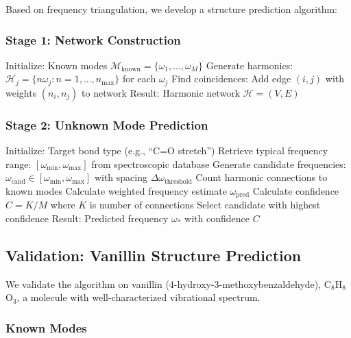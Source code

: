Based on frequency triangulation, we develop a structure prediction algorithm:

\subsubsection{Stage 1: Network Construction}

\begin{algorithmic}[1]
\State Initialize: Known modes $\mathcal{M}_{\text{known}} = \{\omega_1, ..., \omega_M\}$
\State Generate harmonics: $\mathcal{H}_j = \{n\omega_j : n = 1, ..., n_{\max}\}$ for each $\omega_j$
\State Find coincidences:
            \State Add edge $(i, j)$ with weights $(n_i, n_j)$ to network
        \EndIf
    \EndFor
\EndFor
\State Result: Harmonic network $\mathcal{H} = (V, E)$
\end{algorithmic}

\subsubsection{Stage 2: Unknown Mode Prediction}

\begin{algorithmic}[1]
\State Initialize: Target bond type (e.g., ``C=O stretch'')
\State Retrieve typical frequency range: $[\omega_{\min}, \omega_{\max}]$ from spectroscopic database
\State Generate candidate frequencies: $\omega_{\text{cand}} \in [\omega_{\min}, \omega_{\max}]$ with spacing $\Delta\omega_{\text{threshold}}$
    \State Count harmonic connections to known modes
    \State Calculate weighted frequency estimate $\omega_{\text{pred}}$
    \State Calculate confidence $C = K/M$ where $K$ is number of connections
\EndFor
\State Select candidate with highest confidence
\State Result: Predicted frequency $\omega_*$ with confidence $C$
\end{algorithmic}

\subsection{Validation: Vanillin Structure Prediction}

We validate the algorithm on vanillin (4-hydroxy-3-methoxybenzaldehyde), C$_8$H$_8$O$_3$, a molecule with well-characterized vibrational spectrum.

\subsubsection{Known Modes}

